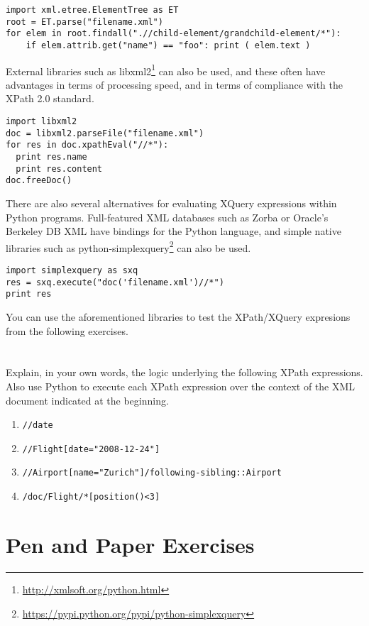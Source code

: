 \documentclass[12pt]{article}
\begin{document}
\begin{verbatim}
import xml.etree.ElementTree as ET
root = ET.parse("filename.xml")
for elem in root.findall(".//child-element/grandchild-element/*"):
    if elem.attrib.get("name") == "foo": print ( elem.text )
\end{verbatim}

External libraries such as libxml2\footnote{\url{http://xmlsoft.org/python.html}} can also be used, and these often have advantages in terms of processing speed, and in terms of compliance with the XPath 2.0 standard.

\begin{verbatim}
import libxml2
doc = libxml2.parseFile("filename.xml")
for res in doc.xpathEval("//*"):
  print res.name
  print res.content
doc.freeDoc()
\end{verbatim}

There are also several alternatives for evaluating XQuery expressions within Python programs. Full-featured XML databases such as Zorba or Oracle's Berkeley DB XML have bindings for the Python language, and simple native libraries such as python-simplexquery\footnote{\url{https://pypi.python.org/pypi/python-simplexquery}} can also be used.

\begin{verbatim}
import simplexquery as sxq
res = sxq.execute("doc('filename.xml')//*")
print res
\end{verbatim}

You can use the aforementioned libraries to test the XPath/XQuery expresions from the following exercises.

\section{}

Explain, in your own words, the logic underlying the following XPath expressions. Also use Python to execute each XPath expression over the context of the XML document indicated at the beginning.

\begin{enumerate}
\item {\tt //date }
\item {\tt //Flight[date="2008-12-24"] }
\item {\tt //Airport[name="Zurich"]/following-sibling::Airport }
\item {\tt /doc/Flight/*[position()<3] }
\end{enumerate}

\section{Pen and Paper Exercises}
\end{document}
